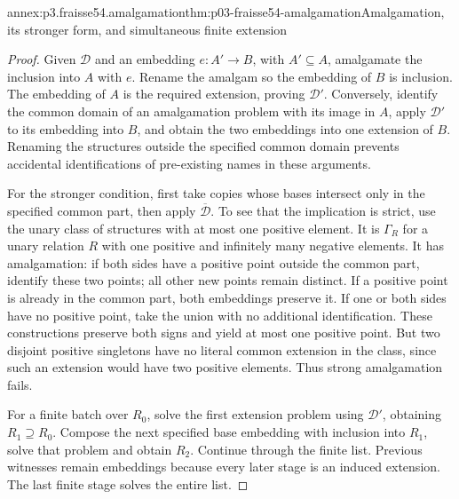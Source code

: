 \begin{annexitem}{annex:p3.fraisse54.amalgamation}{thm:p03-fraisse54-amalgamation}{Amalgamation, its stronger form, and simultaneous finite extension}
\begin{proof}
Given \(\mathcal D\) and an embedding \(e:A'\to B\), with
\(A'\subseteq A\), amalgamate the inclusion into \(A\) with \(e\).
Rename the amalgam so the embedding of \(B\) is inclusion. The embedding
of \(A\) is the required extension, proving \(\mathcal D'\).
Conversely, identify the common domain of an amalgamation problem with
its image in \(A\), apply \(\mathcal D'\) to its embedding into
\(B\), and obtain the two embeddings into one extension of \(B\).
Renaming the structures outside the specified common domain prevents
accidental identifications of pre-existing names in these arguments.

For the stronger condition, first take copies whose bases intersect only
in the specified common part, then apply \(\overline{\mathcal D}\).
To see that the implication is strict, use the unary class of structures
with at most one positive element. It is \(\Gamma_R\) for a unary
relation \(R\) with one positive and infinitely many negative elements.
It has amalgamation: if both sides have a positive point outside the
common part, identify these two points; all other new points remain
distinct. If a positive point is already in the common part, both
embeddings preserve it. If one or both sides have no positive point,
take the union with no additional identification. These constructions
preserve both signs and yield at most one positive point. But two disjoint
positive singletons have no literal common extension in the class, since
such an extension would have two positive elements. Thus strong
amalgamation fails.

For a finite batch over \(R_0\), solve the first extension problem using
\(\mathcal D'\), obtaining \(R_1\supseteq R_0\). Compose the next
specified base embedding with inclusion into \(R_1\), solve that problem
and obtain \(R_2\). Continue through the finite list. Previous witnesses
remain embeddings because every later stage is an induced extension.
The last finite stage solves the entire list.
\end{proof}
\end{annexitem}

